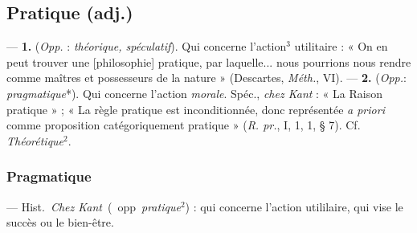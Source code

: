 \subsection{Pratique (adj.)}
 — {\bf 1.} ({\it Opp.} : {\it théorique, spéculatif}).
Qui concerne l’action$^3$ utilitaire : « On en peut trouver une [philosophie]
pratique, par laquelle... nous pourrions nous rendre comme maîtres et
possesseurs de la nature » (Descartes, {\it Méth.}, VI). — {\bf 2.}
({\it Opp.}: {\it pragmatique}*). Qui concerne l’action
{\it morale}. Spéc., {\it chez Kant} : « La Raison pratique » ; « La règle
pratique est inconditionnée, donc représentée {\it a priori} comme
proposition catégoriquement pratique » ({\it R. pr.}, I, 1, 1, § 7). Cf.
{\it Théorétique}$^2$.

\subsubsection{Pragmatique}
 — \si{Hist.} {\it Chez Kant} (opp. {\it pratique}$^2$) : qui
concerne l'action utililaire, qui vise le succès ou le bien-être.


